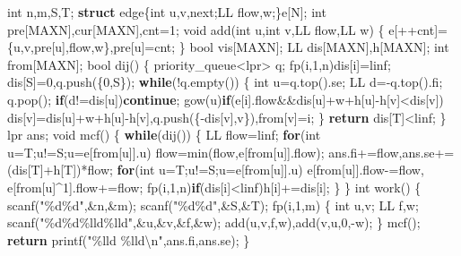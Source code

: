 \documentclass[
]{article}
\newenvironment{Shaded}{}{}
\newcommand{\ControlFlowTok}[1]{\textcolor[rgb]{0.00,0.44,0.13}{\textbf{#1}}}
\newcommand{\DataTypeTok}[1]{\textcolor[rgb]{0.56,0.13,0.00}{#1}}
\newcommand{\DecValTok}[1]{\textcolor[rgb]{0.25,0.63,0.44}{#1}}
\newcommand{\KeywordTok}[1]{\textcolor[rgb]{0.00,0.44,0.13}{\textbf{#1}}}
\newcommand{\NormalTok}[1]{#1}
\newcommand{\SpecialCharTok}[1]{\textcolor[rgb]{0.25,0.44,0.63}{#1}}
\newcommand{\StringTok}[1]{\textcolor[rgb]{0.25,0.44,0.63}{#1}}
\begin{document}
\begin{Shaded}
\begin{Highlighting}[]
\DataTypeTok{int}\NormalTok{ n,m,S,T;}
\KeywordTok{struct}\NormalTok{ edge\{}\DataTypeTok{int}\NormalTok{ u,v,next;LL flow,w;\}e[N];}
\DataTypeTok{int}\NormalTok{ pre[MAXN],cur[MAXN],cnt=}\DecValTok{1}\NormalTok{;}
\DataTypeTok{void}\NormalTok{ add(}\DataTypeTok{int}\NormalTok{ u,}\DataTypeTok{int}\NormalTok{ v,LL flow,LL w)}
\NormalTok{\{}
\NormalTok{    e[++cnt]=\{u,v,pre[u],flow,w\},pre[u]=cnt;}
\NormalTok{\}}
\DataTypeTok{bool}\NormalTok{ vis[MAXN];}
\NormalTok{LL dis[MAXN],h[MAXN];}
\DataTypeTok{int}\NormalTok{ from[MAXN];}
\DataTypeTok{bool}\NormalTok{ dij()}
\NormalTok{\{}
\NormalTok{    priority\_queue\textless{}lpr\textgreater{} q;}
\NormalTok{    fp(i,}\DecValTok{1}\NormalTok{,n)dis[i]=linf;}
\NormalTok{    dis[S]=}\DecValTok{0}\NormalTok{,q.push(\{}\DecValTok{0}\NormalTok{,S\});}
    \ControlFlowTok{while}\NormalTok{(!q.empty())}
\NormalTok{    \{}
        \DataTypeTok{int}\NormalTok{ u=q.top().se; LL d={-}q.top().fi; q.pop();}
        \ControlFlowTok{if}\NormalTok{(d!=dis[u])}\ControlFlowTok{continue}\NormalTok{;}
\NormalTok{        gow(u)}\ControlFlowTok{if}\NormalTok{(e[i].flow\&\&dis[u]+w+h[u]{-}h[v]\textless{}dis[v])}
\NormalTok{            dis[v]=dis[u]+w+h[u]{-}h[v],q.push(\{{-}dis[v],v\}),from[v]=i;}
\NormalTok{    \}}
    \ControlFlowTok{return}\NormalTok{ dis[T]\textless{}linf;}
\NormalTok{\}}
\NormalTok{lpr ans;}
\DataTypeTok{void}\NormalTok{ mcf()}
\NormalTok{\{}
    \ControlFlowTok{while}\NormalTok{(dij())}
\NormalTok{    \{}
\NormalTok{        LL flow=linf;}
        \ControlFlowTok{for}\NormalTok{(}\DataTypeTok{int}\NormalTok{ u=T;u!=S;u=e[from[u]].u)}
\NormalTok{            flow=min(flow,e[from[u]].flow);}
\NormalTok{        ans.fi+=flow,ans.se+=(dis[T]+h[T])*flow;}
        \ControlFlowTok{for}\NormalTok{(}\DataTypeTok{int}\NormalTok{ u=T;u!=S;u=e[from[u]].u)}
\NormalTok{            e[from[u]].flow{-}=flow,}
\NormalTok{            e[from[u]\^{}}\DecValTok{1}\NormalTok{].flow+=flow;}
\NormalTok{        fp(i,}\DecValTok{1}\NormalTok{,n)}\ControlFlowTok{if}\NormalTok{(dis[i]\textless{}linf)h[i]+=dis[i];}
\NormalTok{    \}}
\NormalTok{\}}
\DataTypeTok{int}\NormalTok{ work()}
\NormalTok{\{}
\NormalTok{    scanf(}\StringTok{"}\SpecialCharTok{\%d\%d}\StringTok{"}\NormalTok{,\&n,\&m); }
\NormalTok{    scanf(}\StringTok{"}\SpecialCharTok{\%d\%d}\StringTok{"}\NormalTok{,\&S,\&T);}
\NormalTok{    fp(i,}\DecValTok{1}\NormalTok{,m)}
\NormalTok{    \{}
        \DataTypeTok{int}\NormalTok{ u,v; LL f,w;}
\NormalTok{        scanf(}\StringTok{"}\SpecialCharTok{\%d\%d\%lld\%lld}\StringTok{"}\NormalTok{,\&u,\&v,\&f,\&w);}
\NormalTok{        add(u,v,f,w),add(v,u,}\DecValTok{0}\NormalTok{,{-}w);}
\NormalTok{    \}}
\NormalTok{    mcf();}
    \ControlFlowTok{return}\NormalTok{ printf(}\StringTok{"}\SpecialCharTok{\%lld}\StringTok{ }\SpecialCharTok{\%lld\textbackslash{}n}\StringTok{"}\NormalTok{,ans.fi,ans.se);}
\NormalTok{\}}
\end{Highlighting}
\end{Shaded}
\end{document}

